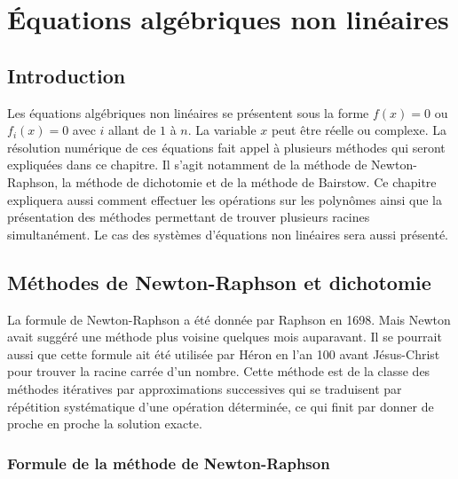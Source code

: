 \chapter{Équations algébriques non linéaires}

\section{Introduction}

Les équations algébriques non linéaires se présentent sous la forme
$f(x) = 0$ ou $f_i(x) = 0$ avec $i$ allant de $1$ à $n$. La variable $x$ peut
être réelle ou complexe. La résolution numérique de ces équations fait appel à
plusieurs méthodes qui seront expliquées dans ce chapitre. Il s'agit notamment
de la méthode de Newton-Raphson, la méthode de dichotomie et de la méthode de
Bairstow. Ce chapitre expliquera aussi comment effectuer les opérations sur
les polynômes ainsi que la présentation des méthodes permettant de trouver
plusieurs racines simultanément. Le cas des systèmes d'équations non linéaires
sera aussi présenté.

\section{Méthodes de Newton-Raphson et dichotomie}

La formule de Newton-Raphson a été donnée par Raphson en 1698. Mais Newton
avait suggéré une méthode plus voisine quelques mois auparavant. Il se
pourrait aussi que cette formule ait été utilisée par Héron en l'an 100 avant
Jésus-Christ pour trouver la racine carrée d'un nombre. Cette méthode est de
la classe des méthodes itératives par approximations successives qui se
traduisent par répétition systématique d'une opération déterminée, ce qui
finit par donner de proche en proche la solution exacte.

\subsection{Formule de la méthode de Newton-Raphson}

